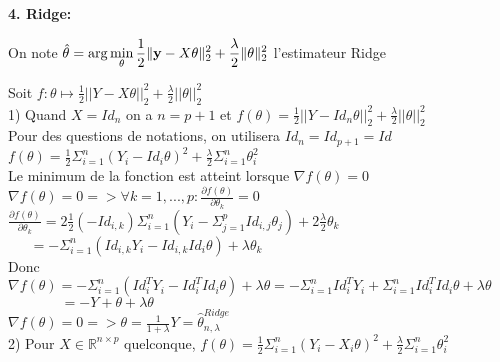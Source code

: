 \vspace{5mm}

{\fontsize{12pt}{22pt} \textbf{4. Ridge:}\par}

\vspace{5mm}

On note $\hat \theta = {\rm arg} \displaystyle\min_{\theta} \frac{1}{2}\| \mathbf{y} -X \theta \|_2^2+ \frac{\lambda}{2}\|\theta\|_2^2$ l’estimateur Ridge

Soit $f: \theta \mapsto \frac{1}{2}||Y-X\theta||_2^2+\frac{\lambda}{2}||\theta||_2^2$ \\

1) Quand $X=Id_n$ on a $n=p+1$ et $f(\theta)=\frac{1}{2}||Y-Id_n\theta||_2^2+\frac{\lambda}{2}||\theta||_2^2$ \\

Pour des questions de notations, on utilisera $Id_n=Id_{p+1}=Id$ \\

$f(\theta)=\frac{1}{2}\Sigma_{i=1}^n(Y_i-Id_i\theta)^2+\frac{\lambda}{2} \Sigma_{i=1}^n \theta_i^2$ \\

Le minimum de la fonction est atteint lorsque $\nabla f(\theta) = 0$ \\

$\nabla f(\theta) = 0 => \forall k=1,...,p: \frac{\partial f(\theta)}{\partial \theta_k}=0$ \\

$\frac{\partial f(\theta)}{\partial \theta_k}=2\frac{1}{2} (-Id_{i,k}) \Sigma_{i=1}^n (Y_i-\Sigma_{j=1}^pId_{i,j}\theta_j)+2\frac{\lambda}{2} \theta_k$ \\

$~~~~~~~=-\Sigma_{i=1}^n(Id_{i,k}Y_i-Id_{i,k}Id_i\theta)+\lambda \theta_k$ \\

Donc $\nabla f(\theta)=-\Sigma_{i=1}^n(Id_i^TY_i-Id_i^TId_i\theta)+\lambda \theta=-\Sigma_{i=1}^nId_i^TY_i+\Sigma_{i=1}^nId_i^TId_i \theta +\lambda \theta$ \\

$~~~~~~~~~~~~~~~~~=-Y+\theta+\lambda \theta$ \\

$\nabla f(\theta) = 0 => \theta = \frac{1}{1+\lambda}Y= \hat{\theta}_{n,\lambda}^{Ridge} $\\


2) Pour $X \in \mathbb{R}^{n \times p}$ quelconque, $f(\theta)=\frac{1}{2}\Sigma_{i=1}^n(Y_i-X_i\theta)^2+\frac{\lambda}{2} \Sigma_{i=1}^n \theta_i^2$ \\

